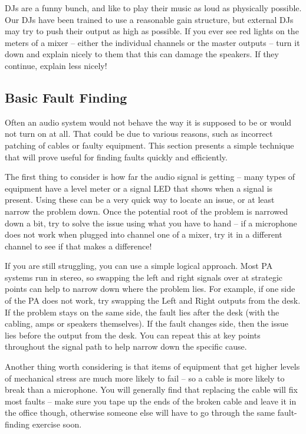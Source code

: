 \documentclass[14pt,twocolumn]{extarticle} %
\begin{document}
DJs are a funny bunch, and like to play their music as loud as physically possible. Our DJs have been trained to use a reasonable gain structure, but external DJs may try to push their output as high as possible. If you ever see red lights on the meters of a mixer – either the individual channels or the master outputs – turn it down and explain nicely to them that this can damage the speakers. If they continue, explain less nicely!

\subsection{Basic Fault Finding}
\label{fault-finding}
Often an audio system would not behave the way it is supposed to be or would not turn on at all. That could be due to various reasons, such as incorrect patching of cables or faulty equipment. This section presents a simple technique that will prove useful for finding faults quickly and efficiently.

The first thing to consider is how far the audio signal is getting – many types of equipment have a level meter or a signal LED that shows when a signal is present. Using these can be a very quick way to locate an issue, or at least narrow the problem down. Once the potential root of the problem is narrowed down a bit, try to solve the issue using what you have to hand – if a microphone does not work when plugged into channel one of a mixer, try it in a different channel to see if that makes a difference!

If you are still struggling, you can use a simple logical approach. Most PA systems run in stereo, so swapping the left and right signals over at strategic points can help to narrow down where the problem lies. For example, if one side of the PA does not work, try swapping the Left and Right outputs from the desk. If the problem stays on the same side, the fault lies after the desk (with the cabling, amps or speakers themselves). If the fault changes side, then the issue lies before the output from the desk. You can repeat this at key points throughout the signal path to help narrow down the specific cause.

Another thing worth considering is that items of equipment that get higher levels of mechanical stress are much more likely to fail – so a cable is more likely to break than a microphone. You will generally find that replacing the cable will fix most faults – make sure you tape up the ends of the broken cable and leave it in the office though, otherwise someone else will have to go through the same fault-finding exercise soon.
\end{document}
